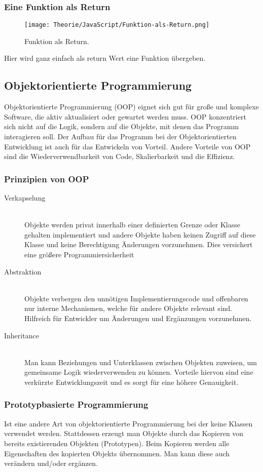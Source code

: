 \begin{center}
    \subsubsection{Eine Funktion als Return}
\begin{figure}[htbp]
    \centerline{\texttt{[image: Theorie/JavaScript/Funktion-als-Return.png]}}
    \caption{Funktion als Return.~\cite{First-Class-Funktion}}
\end{figure}
\end{center}
Hier wird ganz einfach als return Wert eine Funktion übergeben.

\subsection{Objektorientierte Programmierung}
Objektorientierte Programmierung (OOP) eignet sich gut für große und komplexe Software, die aktiv 
aktualisiert oder gewartet werden muss. OOP konzentriert sich nicht auf die Logik, sondern auf die 
Objekte, mit denen das Programm interagieren soll. Der Aufbau für das Programm bei der 
Objektorientierten Entwicklung ist auch für das Entwickeln von Vorteil. Andere Vorteile von OOP 
sind die Wiederverwendbarkeit von Code, Skalierbarkeit und die Effizienz.~\cite{OOP}

\subsubsection{Prinzipien von OOP}
\begin{description}
\item[Verkapselung]\hfill \\
 Objekte werden privat innerhalb einer definierten Grenze oder Klasse gehalten implementiert und 
 andere Objekte haben keinen Zugriff auf diese Klasse und keine Berechtigung
 Änderungen vorzunehmen. Dies versichert eine größere Programmiersicherheit
\item[Abstraktion]\hfill \\
Objekte verbergen den unnötigen Implementierungscode und offenbaren nur interne Mechanismen, welche 
für andere Objekte relevant sind. Hilfreich für Entwickler um Änderungen und Ergänzungen vorzunehmen.
\item[Inheritance]\hfill \\
Man kann Beziehungen und Unterklassen zwischen Objekten zuweisen, um gemeinsame Logik 
wiederverwenden zu können. Vorteile hiervon sind eine verkürzte Entwicklungszeit und 
es sorgt für eine höhere Genauigkeit.
\end{description}

\subsubsection{Prototypbasierte Programmierung}
Ist eine andere Art von objektorientierte Programmierung bei der keine Klassen verwendet werden. 
Stattdessen erzeugt man Objekte durch das Kopieren von bereits existierenden Objekten (Prototypen). 
Beim Kopieren werden alle Eigenschaften des kopierten Objekts übernommen. 
Man kann diese auch verändern und/oder ergänzen.